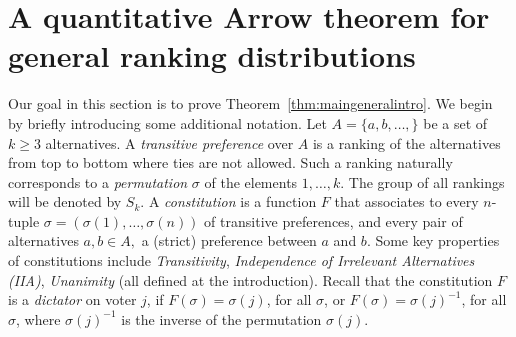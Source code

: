 \documentclass[11pt]{amsart}
\newcommand{\1}{\mathbf{1}}
\theoremstyle{definition}
\theoremstyle{plain}
\theoremstyle{remark}
\numberwithin{equation}{section}
\begin{document}
\section{A quantitative Arrow theorem for general ranking distributions}
Our goal in this section is to prove Theorem~\ref{thm:maingeneralintro}. We begin by briefly introducing some additional notation. Let $A = \{a,b,\ldots,\}$ be a set of $k \geq 3$ alternatives. A {\em transitive preference} over $A$ is a ranking of the alternatives from top to bottom where ties are not allowed. Such a ranking naturally corresponds to a {\em permutation} $\sigma$ of the elements $1,\ldots,k$. The group of all rankings will be denoted by $S_k$.
A {\em constitution} is a function $F$ that associates to every $n$-tuple $\sigma = (\sigma(1),\ldots,\sigma(n))$ of transitive preferences, and every pair of alternatives $a,b \in A,$ a (strict) preference between $a$ and $b$. Some key properties of constitutions include {\em Transitivity}, {\em Independence of Irrelevant Alternatives (IIA)}, {\em Unanimity} (all defined at the introduction). 
Recall that the constitution $F$ is a {\em dictator} on voter $j$, if $F(\sigma) = \sigma(j)$, for all $\sigma$, or 
$F(\sigma) = \sigma(j)^{-1}$, for all $\sigma$, where $\sigma(j)^{-1}$ is the inverse of the permutation $\sigma(j)$. 
\end{document}
